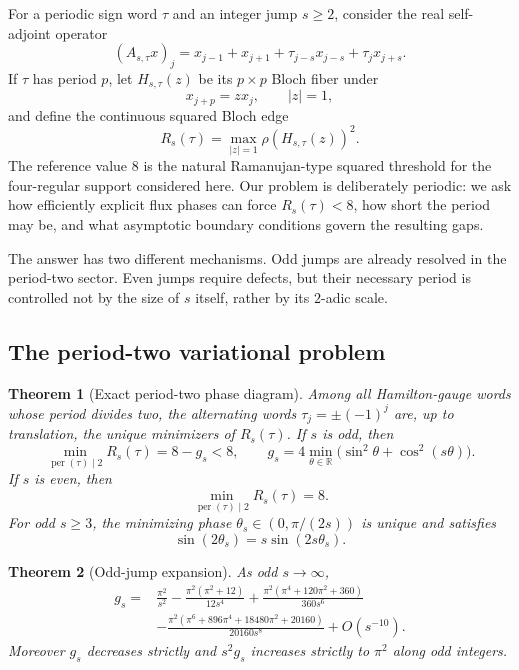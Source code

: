 \documentclass[11pt]{article}
\newtheorem{theorem}{Theorem}[section]
\theoremstyle{remark}
\newcommand{\R}{\mathbb R}
\newcommand{\per}{\operatorname{per}}
\begin{document}
For a periodic sign word $\tau$ and an integer jump $s\ge2$, consider the
real self-adjoint operator
\begin{equation}
 (A_{s,\tau}x)_j
 =x_{j-1}+x_{j+1}
 +\tau_{j-s}x_{j-s}+\tau_jx_{j+s}.
 \label{eq:operator}
\end{equation}
If $\tau$ has period $p$, let $H_{s,\tau}(z)$ be its $p\times p$ Bloch
fiber under
\[
 x_{j+p}=zx_j,\qquad |z|=1,
\]
and define the continuous squared Bloch edge
\begin{equation}
 R_s(\tau)=\max_{|z|=1}\rho(H_{s,\tau}(z))^2.
 \label{eq:bloch-edge}
\end{equation}
The reference value $8$ is the natural Ramanujan-type squared threshold for
the four-regular support considered here.  Our problem is deliberately
periodic: we ask how efficiently explicit flux phases can force
$R_s(\tau)<8$, how short the period may be, and what asymptotic boundary
conditions govern the resulting gaps.

The answer has two different mechanisms.  Odd jumps are already resolved in
the period-two sector.  Even jumps require defects, but their necessary
period is controlled not by the size of $s$ itself, rather by its $2$-adic
scale.

\subsection{The period-two variational problem}

\begin{theorem}[Exact period-two phase diagram]
\label{thm:period-two}
Among all Hamilton-gauge words whose period divides two, the alternating
words $\tau_j=\pm(-1)^j$ are, up to translation, the unique minimizers of
$R_s(\tau)$.  If $s$ is odd, then
\[
 \min_{\per(\tau)\mid2}R_s(\tau)=8-g_s<8,
 \qquad
 g_s=4\min_{\theta\in\R}
 \bigl(\sin^2\theta+\cos^2(s\theta)\bigr).
\]
If $s$ is even, then
\[
 \min_{\per(\tau)\mid2}R_s(\tau)=8.
\]
For odd $s\ge3$, the minimizing phase $\theta_s\in(0,\pi/(2s))$ is unique
and satisfies
\[
 \sin(2\theta_s)=s\sin(2s\theta_s).
\]
\end{theorem}

\begin{theorem}[Odd-jump expansion]
\label{thm:odd-expansion}
As odd $s\to\infty$,
\[
\begin{aligned}
 g_s={}&\frac{\pi^2}{s^2}
 -\frac{\pi^2(\pi^2+12)}{12s^4}
 +\frac{\pi^2(\pi^4+120\pi^2+360)}{360s^6}\\
 &-\frac{\pi^2(\pi^6+896\pi^4+18480\pi^2+20160)}{20160s^8}
 +O(s^{-10}).
\end{aligned}
\]
Moreover $g_s$ decreases strictly and $s^2g_s$ increases strictly to
$\pi^2$ along odd integers.
\end{theorem}
\end{document}
